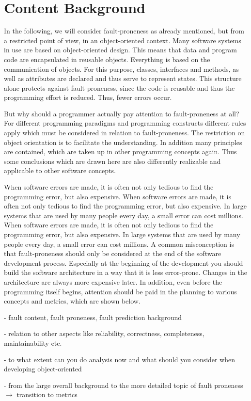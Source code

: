 \section{Content Background}\label{content}

In the following, we will consider fault-proneness as already mentioned, but from a restricted point of view, in an object-oriented context. Many software systems in use are based on object-oriented design. This means that data and program code are encapsulated in reusable objects. Everything is based on the communication of objects. For this purpose, classes, interfaces and methods, as well as attributes are declared and thus serve to represent states. This structure alone protects against fault-proneness, since the code is reusable and thus the programming effort is reduced. Thus, fewer errors occur. 

But why should a programmer actually pay attention to fault-proneness at all? For different programming paradigms and programming constructs different rules apply which must be considered in relation to fault-proneness.  The restriction on object orientation is to facilitate the understanding. In addition many principles are contained, which are taken up in other programming concepts again. Thus some conclusions which are drawn here are also differently realizable and applicable to other software concepts.

When software errors are made, it is often not only tedious to find the programming error, but also expensive. When software errors are made, it is often not only tedious to find the programming error, but also expensive. In large systems that are used by many people every day, a small error can cost millions. When software errors are made, it is often not only tedious to find the programming error, but also expensive. In large systems that are used by many people every day, a small error can cost millions. A common misconception is that fault-proneness should only be considered at the end of the software development process. Especially at the beginning of the development you should build the software architecture in a way that it is less error-prone. Changes in the architecture are always more expensive later. In addition, even before the programming itself begins, attention should be paid in the planning to various concepts and metrics, which are shown below.


- fault content, fault proneness, fault prediction background

- relation to other aspects like reliability, correctness, completeness, maintainability etc.

- to what extent can you do analysis now and what should you consider when developing object-oriented

- from the large overall background to the more detailed topic of fault proneness $\rightarrow$ transition to metrics